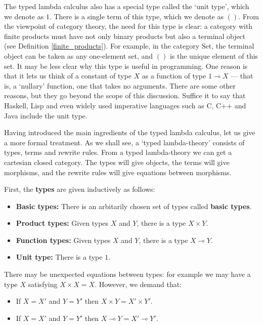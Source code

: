 \documentclass[12pt]{article}
\newcommand{\Set}{\mathrm{Set}}
\newcommand{\lhom}{\multimap}
\begin{document}
The typed lambda calculus also has a special type called the `unit
type', which we denote as $1$.  There is a single term of this type,
which we denote as $()$.  From the viewpoint of category theory, the
need for this type is clear: a category with finite products must have
not only binary products but also a terminal object (see Definition
\ref{finite_products}).  For example, in the category $\Set$, the
terminal object can be taken as any one-element set, and $()$ is the
unique element of this set.  It may be less clear why this type is
useful in programming.  One reason is that it lets us think of a
constant of type $X$ as a function of type $1 \lhom X$ --- that is,
a `nullary' function, one that takes no arguments.  There are some
other reasons, but they go beyond the scope of this discussion.  
Suffice it to say that Haskell, Lisp and even widely used imperative 
languages such as C, C++ and Java include the unit type.

Having introduced the main ingredients of the typed lambda calculus,
let us give a more formal treatment.  As we shall see, a `typed
lambda-theory' consists of types, terms and rewrite rules.  From a
typed lambda-theory we can get a cartesian closed category.  The types
will give objects, the terms will give morphisms, and the rewrite
rules will give equations between morphisms.

First, the {\bf types} are given inductively as follows:
\begin{itemize}
\item {\bf Basic types:}
There is an arbitarily chosen set of types called {\bf basic types}.
\item {\bf Product types:}
Given types $X$ and $Y$, there is a type $X \times Y$.
\item {\bf Function types:}
Given types $X$ and $Y$, there is a type $X \lhom Y$.
\item {\bf Unit type:} There is a type $1$.
\end{itemize}
There may be unexpected equations between types: for example we may 
have a type $X$ satisfying $X \times X = X$.  However,
we demand that:
\begin{itemize}
\item
If $X = X'$ and $Y = Y'$ then $X \times Y = X' \times Y'$.
\item
If $X = X'$ and $Y = Y'$ then $X \lhom Y = X' \lhom Y'$.
\end{itemize}
\end{document}
